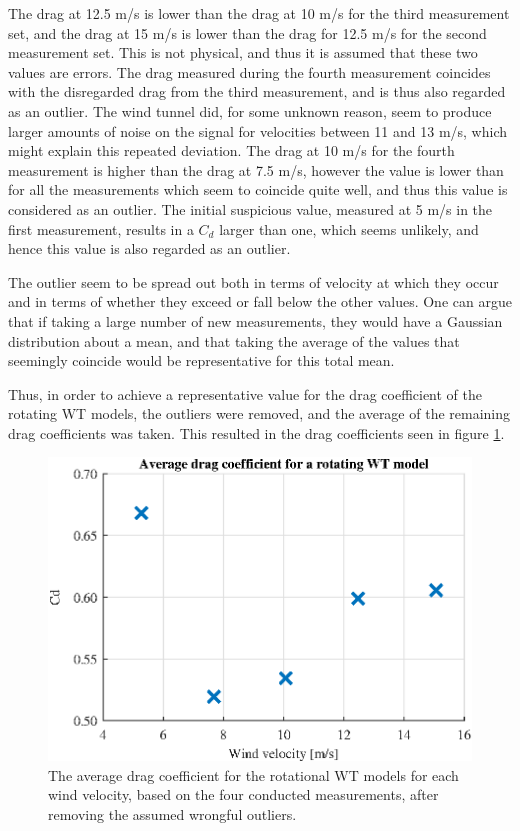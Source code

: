 The drag at 12.5 m/s is lower than the drag at 10 m/s for the third measurement set, and the drag at 15 m/s is lower than the drag for 12.5 m/s for the second measurement set. This is not physical, and thus it is assumed that these two values are errors. The drag measured during the fourth measurement coincides with the disregarded drag from the third measurement, and is thus also regarded as an outlier. The wind tunnel did, for some unknown reason, seem to produce larger amounts of noise on the signal for velocities between 11 and 13 m/s, which might explain this repeated deviation. The drag at 10 m/s for the fourth measurement is higher than the drag at 7.5 m/s, however the value is lower than for all the measurements which seem to coincide quite well, and thus this value is considered as an outlier. The initial suspicious value, measured at 5 m/s in the first measurement, results in a $C_d$ larger than one, which seems unlikely, and hence this value is also regarded as an outlier. 

The outlier seem to be spread out both in terms of velocity at which they occur and in terms of whether they exceed or fall below the other values. One can argue that if taking a large number of new measurements, they would have a Gaussian distribution about a mean, and that taking the average of the values that seemingly coincide would be representative for this total mean. %

Thus, in order to achieve a representative value for the drag coefficient of the rotating WT models, the outliers were removed, and the average of the remaining drag coefficients was taken. This resulted in the drag coefficients seen in figure \ref{fig:RotationalAvg}.

\begin{figure}[h!]
    \centering
    \includegraphics[width=\linewidth]{0_Images/RotationalAverage.eps}
    \caption{The average drag coefficient for the rotational WT models for each wind velocity, based on the four conducted measurements, after removing the assumed wrongful outliers.}
    \label{fig:RotationalAvg}
\end{figure}

